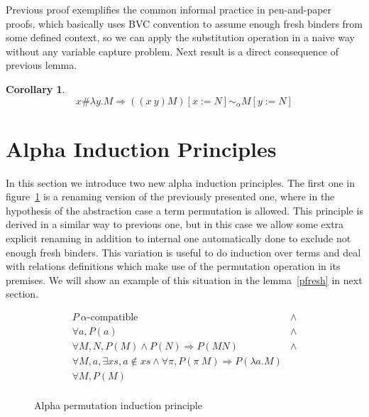 \documentclass[preprint,10pt]{sigplanconf}
\newcommand{\lam}{\ensuremath{\lambda}}
\newcommand{\alpsym}{\ensuremath{\sim_\alpha}}
\newtheorem{lemma}{Lemma}
\newtheorem{coro}{Corollary}
\begin{document}
Previous proof exemplifies the common informal practice in pen-and-paper proofs, which basically uses BVC convention to assume enough fresh binders from some defined context, so we can apply the substitution operation in a naive way without any variable capture problem. Next result is a direct consequence of previous lemma.

\begin{coro}
\label{pequivcoro}
\[ x \# \lam y . M  \Rightarrow ((x\ y) M) [x:=N] \alpsym  M [y := N] \]  
\end{coro}



\section{Alpha Induction Principles}

In this section we introduce two new alpha induction principles. The first one in figure~\ref{fig:alphapermind} is a renaming version of the previously presented one, where in the hypothesis of the abstraction case a term permutation is allowed. This principle is derived in a similar way to previous one, but in this case we allow some extra explicit renaming in addition to internal one automatically done to exclude not enough fresh binders. This variation is useful to do induction over terms and deal with relations definitions which make use of the permutation operation in its premises. We will show an example of this situation in the lemma~\ref{pfresh} in next section.

\begin{figure}[h]
\[ 
  \begin{array}{lc}
    P\ \alpha\text{-compatible} & \wedge \\
    \forall a, P(a) & \wedge\\
    \forall M, N,  P(M) \wedge P(N)  \Rightarrow P (M N) & \wedge \\    
     \forall M, a,  \exists xs, a \not \in xs \wedge \forall \pi, P(\pi\ M)  \Rightarrow P (\lam a . M)  &\\    
    \hline
    \forall M, P(M)\\
  \end{array}
\]
  \caption{Alpha permutation induction principle}
  \label{fig:alphapermind}
\end{figure}
\end{document}
